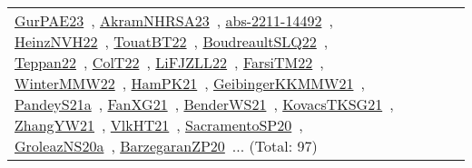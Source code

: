 {\begin{longtable}{lp{3cm}>{\raggedright\arraybackslash}p{6cm}>{\raggedright\arraybackslash}p{6cm}>{\raggedright\arraybackslash}p{8cm}}
\href{works/GurPAE23.pdf}{GurPAE23}~\cite{GurPAE23}, \href{works/AkramNHRSA23.pdf}{AkramNHRSA23}~\cite{AkramNHRSA23}, \href{works/abs-2211-14492.pdf}{abs-2211-14492}~\cite{abs-2211-14492}, \href{works/HeinzNVH22.pdf}{HeinzNVH22}~\cite{HeinzNVH22}, \href{works/TouatBT22.pdf}{TouatBT22}~\cite{TouatBT22}, \href{works/BoudreaultSLQ22.pdf}{BoudreaultSLQ22}~\cite{BoudreaultSLQ22}, \href{works/Teppan22.pdf}{Teppan22}~\cite{Teppan22}, \href{works/ColT22.pdf}{ColT22}~\cite{ColT22}, \href{works/LiFJZLL22.pdf}{LiFJZLL22}~\cite{LiFJZLL22}, \href{works/FarsiTM22.pdf}{FarsiTM22}~\cite{FarsiTM22}, \href{works/WinterMMW22.pdf}{WinterMMW22}~\cite{WinterMMW22}, \href{works/HamPK21.pdf}{HamPK21}~\cite{HamPK21}, \href{works/GeibingerKKMMW21.pdf}{GeibingerKKMMW21}~\cite{GeibingerKKMMW21}, \href{works/PandeyS21a.pdf}{PandeyS21a}~\cite{PandeyS21a}, \href{works/FanXG21.pdf}{FanXG21}~\cite{FanXG21}, \href{works/BenderWS21.pdf}{BenderWS21}~\cite{BenderWS21}, \href{works/KovacsTKSG21.pdf}{KovacsTKSG21}~\cite{KovacsTKSG21}, \href{works/ZhangYW21.pdf}{ZhangYW21}~\cite{ZhangYW21}, \href{works/VlkHT21.pdf}{VlkHT21}~\cite{VlkHT21}, \href{works/SacramentoSP20.pdf}{SacramentoSP20}~\cite{SacramentoSP20}, \href{works/GroleazNS20a.pdf}{GroleazNS20a}~\cite{GroleazNS20a}, \href{works/BarzegaranZP20.pdf}{BarzegaranZP20}~\cite{BarzegaranZP20}... (Total: 97)\\

\end{longtable}}
